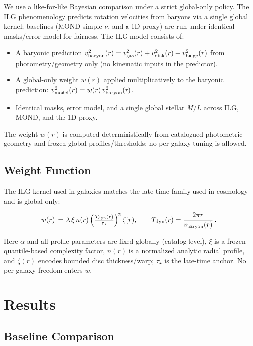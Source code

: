 \documentclass[usenatbib]{mnras}
\begin{document}
We use a like-for-like Bayesian comparison under a strict global-only policy. The ILG phenomenology predicts rotation velocities from baryons via a single global kernel; baselines (MOND simple-$\nu$, and a 1D proxy) are run under identical masks/error model for fairness. The ILG model consists of:

\begin{itemize}
\item A baryonic prediction $v^2_{\rm baryon}(r)=v^2_{\rm gas}(r)+v^2_{\rm disk}(r)+v^2_{\rm bulge}(r)$ from photometry/geometry only (no kinematic inputs in the predictor).
\item A global-only weight $w(r)$ applied multiplicatively to the baryonic prediction: $v^2_{\rm model}(r)=w(r)\,v^2_{\rm baryon}(r)$.
\item Identical masks, error model, and a single global stellar $M/L$ across ILG, MOND, and the 1D proxy.
\end{itemize}

The weight $w(r)$ is computed deterministically from catalogued photometric geometry and frozen global profiles/thresholds; no per-galaxy tuning is allowed.

\subsection{Weight Function}

The ILG kernel used in galaxies matches the late-time family used in cosmology and is global-only:

\begin{equation}
w(r) \,=\, \lambda\,\xi\,n(r)\,\Big(\tfrac{T_{\rm dyn}(r)}{\tau_\star}\Big)^{\!\alpha}\,\zeta(r),\qquad T_{\rm dyn}(r)=\frac{2\pi r}{v_{\rm baryon}(r)}\,.
\end{equation}

Here $\alpha$ and all profile parameters are fixed globally (catalog level), $\xi$ is a frozen quantile-based complexity factor, $n(r)$ is a normalized analytic radial profile, and $\zeta(r)$ encodes bounded disc thickness/warp; $\tau_\star$ is the late-time anchor. No per-galaxy freedom enters $w$.

\section{Results}

\subsection{Baseline Comparison}
\end{document}
